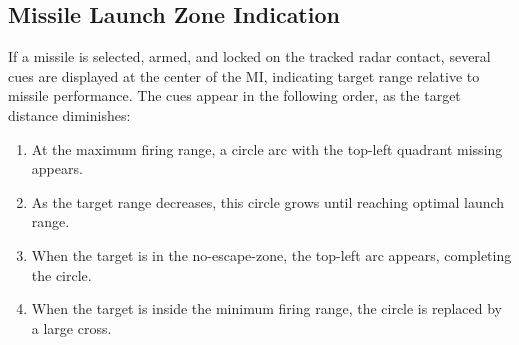 \subsection{Missile Launch Zone Indication}
If a missile is selected, armed, and locked on the tracked radar contact,
several cues are displayed at the center of the MI,
indicating target range relative to missile performance.
The cues appear in the following order, as the target distance diminishes:
\begin{enumerate}[nosep]
  \item At the maximum firing range, a circle arc with the top-left quadrant missing appears.
  \item As the target range decreases, this circle grows until reaching optimal launch range.
  \item When the target is in the no-escape-zone, the top-left arc appears, completing the circle.
  \item When the target is inside the minimum firing range, the circle is replaced by a large cross.
\end{enumerate}
